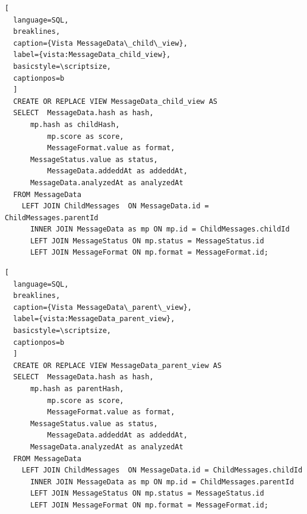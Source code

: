 \begin{lstlisting}[
  language=SQL,
  breaklines, 
  caption={Vista MessageData\_child\_view}, 
  label={vista:MessageData_child_view}, 
  basicstyle=\scriptsize,
  captionpos=b
  ]
  CREATE OR REPLACE VIEW MessageData_child_view AS 
  SELECT  MessageData.hash as hash,
      mp.hash as childHash, 
          mp.score as score,
          MessageFormat.value as format,
      MessageStatus.value as status,
          MessageData.addeddAt as addeddAt,
      MessageData.analyzedAt as analyzedAt
  FROM MessageData 
    LEFT JOIN ChildMessages  ON MessageData.id = ChildMessages.parentId
      INNER JOIN MessageData as mp ON mp.id = ChildMessages.childId
      LEFT JOIN MessageStatus ON mp.status = MessageStatus.id
      LEFT JOIN MessageFormat ON mp.format = MessageFormat.id;
\end{lstlisting}

\begin{lstlisting}[
  language=SQL,
  breaklines, 
  caption={Vista MessageData\_parent\_view}, 
  label={vista:MessageData_parent_view}, 
  basicstyle=\scriptsize,
  captionpos=b
  ]
  CREATE OR REPLACE VIEW MessageData_parent_view AS 
  SELECT  MessageData.hash as hash,
      mp.hash as parentHash, 
          mp.score as score,
          MessageFormat.value as format,
      MessageStatus.value as status,
          MessageData.addeddAt as addeddAt,
      MessageData.analyzedAt as analyzedAt
  FROM MessageData 
    LEFT JOIN ChildMessages  ON MessageData.id = ChildMessages.childId
      INNER JOIN MessageData as mp ON mp.id = ChildMessages.parentId
      LEFT JOIN MessageStatus ON mp.status = MessageStatus.id
      LEFT JOIN MessageFormat ON mp.format = MessageFormat.id;
\end{lstlisting}


